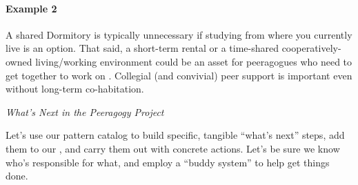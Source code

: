 \begin{refsection}
\paragraph{Example 2}
A shared Dormitory is typically unnecessary if studying from where you
currently live is an option.  That said, a short-term rental
or a time-shared cooperatively-owned living\slash working environment
could be an asset for peeragogues who need to get together 
to work on .  Collegial (and convivial) peer support
is important even without long-term co-habitation.  


\begin{framed}
\noindent 
\emph{What's Next in the Peeragogy Project}
\begin{collectinmacro}{\SpecificWN}{}{}
Let's use our pattern catalog to build specific, tangible ``what's
next'' steps, add them to our , and carry them
out with concrete actions.  Let's be sure we know who's responsible
for what, and employ a ``buddy system'' to help get things done.
\end{collectinmacro}
\SpecificWN
\end{framed}


\printbibliography[heading=subbibliography]
\end{refsection}
